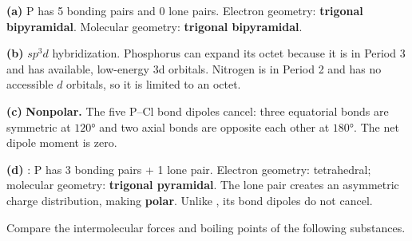 \documentclass[addpoints]{exam}
\begin{document}
\begin{questions}
\begin{solution}[9cm]
\textbf{(a)} P has 5 bonding pairs and 0 lone pairs.
Electron geometry: \textbf{trigonal bipyramidal}.
Molecular geometry: \textbf{trigonal bipyramidal}.

\textbf{(b)} $sp^3d$ hybridization. Phosphorus can expand its octet because it is in Period 3
and has available, low-energy 3d orbitals. Nitrogen is in Period 2 and has no accessible $d$
orbitals, so it is limited to an octet.

\textbf{(c)} \textbf{Nonpolar.} The five P--Cl bond dipoles cancel: three equatorial bonds are
symmetric at $120°$ and two axial bonds are opposite each other at $180°$. The net dipole moment
is zero.

\textbf{(d)} : P has 3 bonding pairs + 1 lone pair. Electron geometry: tetrahedral;
molecular geometry: \textbf{trigonal pyramidal}. The lone pair creates an asymmetric charge
distribution, making  \textbf{polar}. Unlike , its bond dipoles do not cancel.
\end{solution}

\question Compare the intermolecular forces and boiling points of the following substances.
\end{questions}
\end{document}
